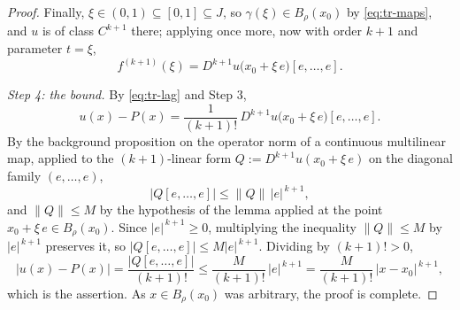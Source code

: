 \begin{proof}
Finally, $\xi\in(0,1)\subseteq[0,1]\subseteq J$, so $\gamma(\xi)\in B_{\rho}(x_0)$ by
\eqref{eq:tr-maps}, and $u$ is of class $C^{k+1}$ there; applying
 once more, now with order $k+1$ and parameter $t=\xi$,
\begin{equation}\label{eq:tr-rayxi}
  f^{(k+1)}(\xi)=D^{k+1}u\bigl(x_0+\xi\,e\bigr)[e,\ldots,e].
\end{equation}

\medskip\noindent\emph{Step 4: the bound.}
By \eqref{eq:tr-lag} and Step 3,
\[
  u(x)-P(x)=\frac{1}{(k+1)!}\,D^{k+1}u\bigl(x_0+\xi\,e\bigr)[e,\ldots,e].
\]
By the background proposition on the operator norm of a continuous multilinear map, applied to
the $(k+1)$-linear form $Q:=D^{k+1}u(x_0+\xi\,e)$ on the diagonal family $(e,\ldots,e)$,
\[
  \bigl\lvert Q[e,\ldots,e]\bigr\rvert\le\lVert Q\rVert\,\lvert e\rvert^{\,k+1},
\]
and $\lVert Q\rVert\le M$ by the hypothesis of the lemma applied at the point
$x_0+\xi\,e\in B_{\rho}(x_0)$.  Since $\lvert e\rvert^{\,k+1}\ge0$, multiplying the inequality
$\lVert Q\rVert\le M$ by $\lvert e\rvert^{\,k+1}$ preserves it, so
$\bigl\lvert Q[e,\ldots,e]\bigr\rvert\le M\lvert e\rvert^{\,k+1}$.  Dividing by $(k+1)!>0$,
\[
  \bigl\lvert u(x)-P(x)\bigr\rvert
  =\frac{\bigl\lvert Q[e,\ldots,e]\bigr\rvert}{(k+1)!}
  \le\frac{M}{(k+1)!}\,\lvert e\rvert^{\,k+1}
  =\frac{M}{(k+1)!}\,\lvert x-x_0\rvert^{\,k+1},
\]
which is the assertion.  As $x\in B_{\rho}(x_0)$ was arbitrary, the proof is complete.
\end{proof}
